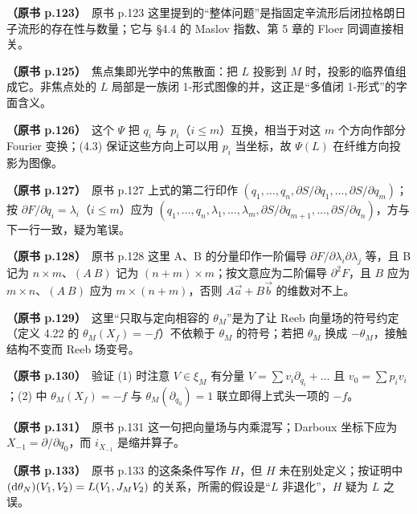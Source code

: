 \noindent \textbf{（原书 p.123）}\ 原书 p.123 这里提到的“整体问题”是指固定辛流形后闭拉格朗日子流形的存在性与数量；它与 §4.4 的 Maslov 指数、第 5 章的 Floer 同调直接相关。\par\smallskip

\noindent \textbf{（原书 p.125）}\ 焦点集即光学中的焦散面：把 $L$ 投影到 $M$ 时，投影的临界值组成它。非焦点处的 $L$ 局部是一族闭 1-形式图像的并，这正是“多值闭 1-形式”的字面含义。\par\smallskip

\noindent \textbf{（原书 p.126）}\ 这个 $\Psi$ 把 $q_i$ 与 $p_i$（$i\le m$）互换，相当于对这 $m$ 个方向作部分 Fourier 变换；(4.3) 保证这些方向上可以用 $p_i$ 当坐标，故 $\Psi(L)$ 在纤维方向投影为图像。\par\smallskip

\noindent \textbf{（原书 p.127）}\ 原书 p.127 上式的第二行印作 $(q_1,\dots,q_n,\partial S/\partial q_1,\dots,\partial S/\partial q_m)$；按 $\partial F/\partial q_i=\lambda_i$（$i\le m$）应为 $(q_1,\dots,q_n,\lambda_1,\dots,\lambda_m,\partial S/\partial q_{m+1},\dots,\partial S/\partial q_n)$，方与下一行一致，疑为笔误。\par\smallskip

\noindent \textbf{（原书 p.128）}\ 原书 p.128 这里 A、B 的分量印作一阶偏导 $\partial F/\partial\lambda_i\partial\lambda_j$ 等，且 B 记为 $n\times m$、$(A\ B)$ 记为 $(n+m)\times m$；按文意应为二阶偏导 $\partial^2F$，且 $B$ 应为 $m\times n$、$(A\ B)$ 应为 $m\times(n+m)$，否则 $A\vec a+B\vec b$ 的维数对不上。\par\smallskip

\noindent \textbf{（原书 p.129）}\ 这里“只取与定向相容的 $\theta_M$”是为了让 Reeb 向量场的符号约定（定义 4.22 的 $\theta_M(X_f)=-f$）不依赖于 $\theta_M$ 的符号；若把 $\theta_M$ 换成 $-\theta_M$，接触结构不变而 Reeb 场变号。\par\smallskip

\noindent \textbf{（原书 p.130）}\ 验证 (1) 时注意 $V\in\xi_M$ 有分量 $V=\sum v_i\partial_{q_i}+\dots$ 且 $v_0=\sum p_iv_i$；(2) 中 $\theta_M(X_f)=-f$ 与 $\theta_M(\partial_{q_0})=1$ 联立即得上式头一项的 $-f$。\par\smallskip

\noindent \textbf{（原书 p.131）}\ 原书 p.131 这一句把向量场与内乘混写；Darboux 坐标下应为 $X_{-1}=\partial/\partial q_0$，而 $i_{X_{-1}}$ 是缩并算子。\par\smallskip

\noindent \textbf{（原书 p.133）}\ 原书 p.133 的这条条件写作 $H$，但 $H$ 未在别处定义；按证明中 $(\mathrm{d}\theta_N)(V_1,V_2)=L(V_1,J_MV_2)$ 的关系，所需的假设是“$L$ 非退化”，$H$ 疑为 $L$ 之误。\par\smallskip

